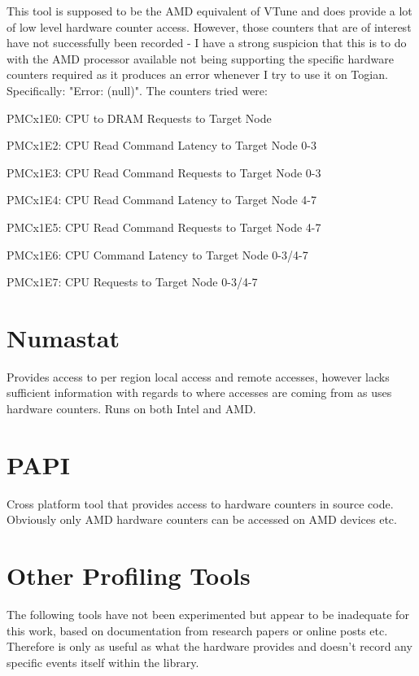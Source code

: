 \documentclass[a4paper,11pt]{article}
\begin{document}
This tool is supposed to be the AMD equivalent of VTune and does provide a lot of low level hardware counter access. However, those counters that are of interest have not successfully been recorded - I have a strong suspicion that this is to do with the AMD processor available not being supporting the specific hardware counters required as it produces an error whenever I try to use it on Togian. Specifically: "Error: (null)". The counters tried were:

\begin{description}
\item PMCx1E0: CPU to DRAM Requests to Target Node
\item PMCx1E2: CPU Read Command Latency to Target Node 0-3
\item PMCx1E3: CPU Read Command Requests to Target Node 0-3
\item PMCx1E4: CPU Read Command Latency to Target Node 4-7
\item PMCx1E5: CPU Read Command Requests to Target Node 4-7
\item PMCx1E6: CPU Command Latency to Target Node 0-3/4-7
\item PMCx1E7: CPU Requests to Target Node 0-3/4-7
\end{description}

\section{Numastat}

Provides access to per region local access and remote accesses, however lacks sufficient information with regards to where accesses are coming from as uses hardware counters. Runs on both Intel and AMD. 

\section{PAPI}

Cross platform tool that provides access to hardware counters in source code. Obviously only AMD hardware counters can be accessed on AMD devices etc. 


\section{Other Profiling Tools}

The following tools have not been experimented but appear to be inadequate for this work, based on documentation from research papers or online posts etc. Therefore is only as useful as what the hardware provides and doesn't record any specific events itself within the library.
\end{document}
